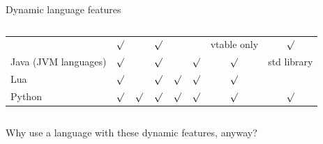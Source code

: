 \documentclass[aspectratio=169]{beamer}
\begin{document}
\begin{frame}{Dynamic language features}
\begin{columns}
\begin{center}
\begin{tabular}{l | c | c | c | c | c | c | c}
         & $\surd$  &                                 & $\surd$ &         &         & vtable only  & $\surd$     \\
Java (JVM languages) & $\surd$  &                                 & $\surd$ &         & $\surd$ & $\surd$ & std library \\
Lua                  & $\surd$  &                                 & $\surd$ & $\surd$ & $\surd$ & $\surd$ &             \\
Python               & $\surd$  & $\surd$                         & $\surd$ & $\surd$ & $\surd$ & $\surd$ & $\surd$     \\
\end{tabular}
\end{center}
\end{columns}
\end{frame}

\begin{frame}{Why use a language with these dynamic features, anyway?}
\vspace{0.35 cm}
\begin{center}
\end{center}
\end{frame}
\end{document}
